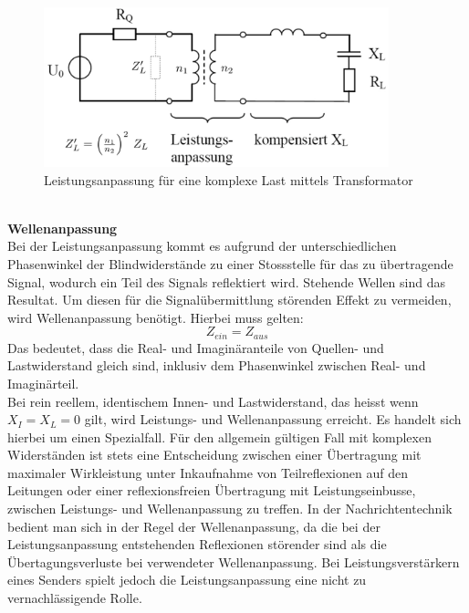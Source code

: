 \begin{figure}[!ht]
	\centering
	\includegraphics[width=10cm]{content/bilder/AnpassungKomplexerLast.pdf}%
	\caption{Leistungsanpassung für eine komplexe Last mittels Transformator \cite{Tekom}}
	\label{fig:AnpassungKomplexerLast}
\end{figure}\\
\textbf{Wellenanpassung} \\
Bei der Leistungsanpassung kommt es aufgrund der unterschiedlichen Phasenwinkel der Blindwiderstände zu einer Stossstelle für das zu übertragende Signal, wodurch ein Teil des Signals reflektiert wird. Stehende Wellen sind das Resultat. Um diesen für die Signalübermittlung störenden Effekt zu vermeiden, wird Wellenanpassung benötigt. Hierbei muss gelten:
\[Z_{ein} = Z_{aus}\]
Das bedeutet, dass die Real- und Imaginäranteile von Quellen- und Lastwiderstand gleich sind, inklusiv dem Phasenwinkel zwischen Real- und Imaginärteil.\\

Bei rein reellem, identischem Innen- und Lastwiderstand, das heisst wenn $X_I = X_L = 0$ gilt, wird Leistungs- und Wellenanpassung erreicht. Es handelt sich hierbei um einen Spezialfall. Für den allgemein gültigen Fall mit komplexen Widerständen ist stets eine Entscheidung zwischen einer Übertragung mit maximaler Wirkleistung unter Inkaufnahme von Teilreflexionen auf den Leitungen oder einer reflexionsfreien Übertragung mit Leistungseinbusse, zwischen Leistungs- und Wellenanpassung zu treffen. In der Nachrichtentechnik bedient man sich in der Regel der Wellenanpassung, da die bei der Leistungsanpassung entstehenden Reflexionen störender sind als die Übertagungsverluste bei verwendeter Wellenanpassung. Bei Leistungsverstärkern eines Senders spielt jedoch die Leistungsanpassung eine nicht zu vernachlässigende Rolle. \\


